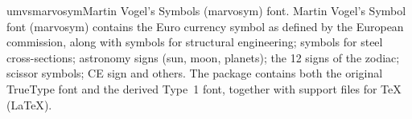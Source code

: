 \documentclass{ddltxtyp}
\begin{document}

\begin{package}{umvs}{marvosym}{Martin Vogel's Symbols (marvosym) font.}
Martin Vogel's Symbol font (marvosym) contains the Euro
currency symbol as defined by the European commission, along
with symbols for structural engineering; symbols for steel
cross-sections; astronomy signs (sun, moon, planets); the 12
signs of the zodiac; scissor symbols; CE sign and others. The
package contains both the original TrueType font and the
derived Type~1 font, together with support files for {\TeX}
({\LaTeX}).
\end{package}

\end{document}
